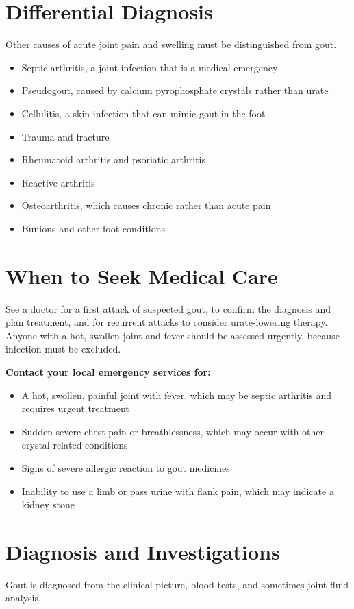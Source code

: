 \section*{Differential Diagnosis}
Other causes of acute joint pain and swelling must be distinguished from gout.

\begin{itemize}
    \item Septic arthritis, a joint infection that is a medical emergency
    \item Pseudogout, caused by calcium pyrophosphate crystals rather than urate
    \item Cellulitis, a skin infection that can mimic gout in the foot
    \item Trauma and fracture
    \item Rheumatoid arthritis and psoriatic arthritis
    \item Reactive arthritis
    \item Osteoarthritis, which causes chronic rather than acute pain
    \item Bunions and other foot conditions
\end{itemize}

\section*{When to Seek Medical Care}
See a doctor for a first attack of suspected gout, to confirm the diagnosis and plan treatment, and for recurrent attacks to consider urate-lowering therapy. Anyone with a hot, swollen joint and fever should be assessed urgently, because infection must be excluded.

\textbf{Contact your local emergency services for:}
\begin{itemize}
    \item A hot, swollen, painful joint with fever, which may be septic arthritis and requires urgent treatment
    \item Sudden severe chest pain or breathlessness, which may occur with other crystal-related conditions
    \item Signs of severe allergic reaction to gout medicines
    \item Inability to use a limb or pass urine with flank pain, which may indicate a kidney stone
\end{itemize}

\section*{Diagnosis and Investigations}
Gout is diagnosed from the clinical picture, blood tests, and sometimes joint fluid analysis.

